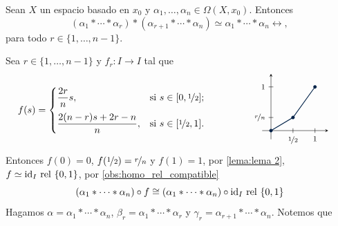     \begin{lema}
    \label{lema:asociativiadad_Pi1}
        Sean $X$ un espacio basado en $x_0$ y $\alpha_1,\ldots,\alpha_n\in \Omega(X,x_0)$. Entonces
        \begin{equation}
        \label{eq:asociatividad_lazos}
            (\alpha_1*\cdots*\alpha_r)*(\alpha_{r+1}*\cdots*\alpha_n)\simeq \alpha_1*\cdots*\alpha_n\rel,
        \end{equation}
        para todo $r\in\{1,\ldots,n-1\}$.
    \end{lema}
    \begin{dem}
        Sea $r\in\{1,\ldots,n-1\}$ y $f_r:I\to I$ tal que
    \begin{align*}
    f(s) &=
    \begin{cases} 
        \dfrac{2r}{n}s, & \text{si } s\in [0,\nicefrac{1}{2}]; \\[2ex]
        \dfrac{2(n-r)s + 2r - n}{n}, & \text{si } s \in [\nicefrac{1}{2},1].
    \end{cases}
    \hspace{1.5cm} %
    \vcenter{\hbox{
    \begin{tikzpicture}[scale=1.6]
        \draw[->, >=stealth] (-0.2, 0) -- (1.3, 0);
        \draw[->, >=stealth] (0, -0.2) -- (0, 1.3);
        \draw (0.5, 1.5pt) -- (0.5, -1.5pt) node[below, font=\footnotesize] {$\nicefrac{1}{2}$};
        \draw (1, 1.5pt) -- (1, -1.5pt) node[below, font=\footnotesize] {$1$};
        \draw (1.5pt, 0.3) -- (-1.5pt, 0.3) node[left, font=\footnotesize] {$\nicefrac{r}{n}$};
        \draw (1.5pt, 1) -- (-1.5pt, 1) node[left, font=\footnotesize] {$1$};
        \draw[thick, oxfordblue] (0,0) -- (0.5, 0.3) -- (1,1);
        \filldraw[oxfordblue] (0,0) circle (1pt);
        \filldraw[oxfordblue] (0.5, 0.3) circle (1pt);
        \filldraw[oxfordblue] (1,1) circle (1pt);
    \end{tikzpicture}
    }}
    \end{align*}
    Entonces $f(0)=0$, $f(\nicefrac{1}{2})=\nicefrac{r}{n}$ y $f(1)=1$, por \ref{lema:lema 2}, $f\simeq \mathrm{id}_I\mathrm{\ rel\ } \{0,1\}$, por \ref{obs:homo_rel_compatible}
    \begin{equation}
    \label{eq:pre_asociatividad_lazos}
    (\alpha_1*\cdots*\alpha_n)\circ f\cong (\alpha_1*\cdots*\alpha_n)\circ\mathrm{id}_I\mathrm{\ rel\ } \{0,1\}
     \end{equation}
    Hagamos $\alpha=\alpha_1*\cdots*\alpha_n$, $\beta_r=\alpha_1*\cdots*\alpha_r$ y $\gamma_r=\alpha_{r+1}*\cdots*\alpha_n$. Notemos que
    

\end{dem}
